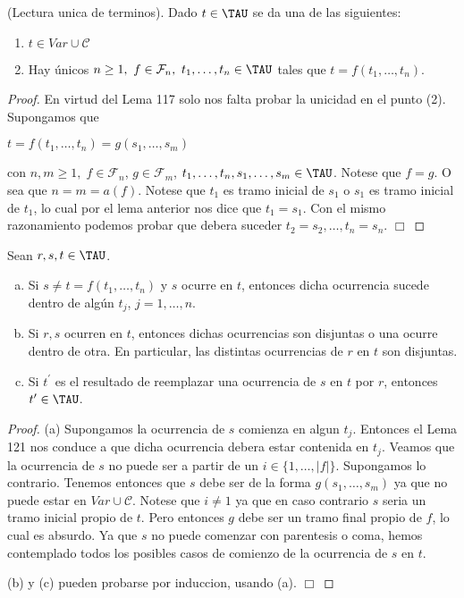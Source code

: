   \begin{theorem}
    \PN (Lectura unica de terminos). Dado $t \in \TAU$ se da una de las siguientes:
    \begin{enumerate}[1)]
      \item $t \in Var \cup \mathcal{C}$
      \item Hay únicos $n \geq 1, \ f \in \mathcal{F}_{n}, \ t_{1}, \dotsc, t_{n} \in \TAU$ tales que $t = f(t_{1},
      \dotsc, t_{n})$.
    \end{enumerate}
  \end{theorem}
  \begin{proof}
    En virtud del Lema 117 solo nos falta probar la unicidad en el punto (2). Supongamos que

    $\displaystyle t=f(t_{1}, \dotsc,t_{n})=g(s_{1}, \dotsc,s_{m}) $

    con $n,m\geq 1,\;f\in \mathcal{F}_{n}$, $g\in \mathcal{F}_{m}$, $ t_{1}, \dotsc,t_{n},s_{1}, \dotsc,s_{m}\in \TAU$. Notese que $f=g$. O sea que $ n=m=a(f)$. Notese que $t_{1}$ es tramo inicial de $s_{1}$ o $s_{1}$ es tramo inicial de $t_{1}$, lo cual por el lema anterior nos dice que $t_{1}=s_{1}$. Con el mismo razonamiento podemos probar que debera suceder $ t_{2}=s_{2}, \dotsc,t_{n}=s_{n}$. $\Box$
  \end{proof}

  \begin{lemma}
    \PN Sean $r, s, t \in \TAU$.
    \begin{enumerate}[(a)]
      \item Si $s \neq t = f(t_{1}, \dotsc, t_{n})$ y $s$ ocurre en $t$, entonces dicha ocurrencia sucede dentro de
        algún $t_{j}$, $j = 1, \dotsc, n$.
      \item Si $r, s$ ocurren en $t$, entonces dichas ocurrencias son disjuntas o una ocurre dentro de otra. En
        particular, las distintas ocurrencias de $r$ en $t$ son disjuntas.
      \item Si $t^{\prime}$ es el resultado de reemplazar una ocurrencia de $s$ en $t$ por $r$, entonces $t^{\prime} \in
        \TAU$.
    \end{enumerate}
  \end{lemma}
  \begin{proof}
    (a) Supongamos la ocurrencia de $s$ comienza en algun $t_{j}$. Entonces el Lema 121 nos conduce a que dicha ocurrencia debera estar contenida en $t_{j}$. Veamos que la ocurrencia de $s$ no puede ser a partir de un $i\in \{1, \dotsc,\lvert f\rvert \}$. Supongamos lo contrario. Tenemos entonces que $s$ debe ser de la forma $g(s_{1}, \dotsc,s_{m})$ ya que no puede estar en $Var \cup \mathcal{C}$. Notese que $i\neq 1$ ya que en caso contrario $s$ seria un tramo inicial propio de $t$. Pero entonces $g$ debe ser un tramo final propio de $f$, lo cual es absurdo. Ya que $s$ no puede comenzar con parentesis o coma, hemos contemplado todos los posibles casos de comienzo de la ocurrencia de $s$ en $t$.

    (b) y (c) pueden probarse por induccion, usando (a). $\Box$
  \end{proof}


